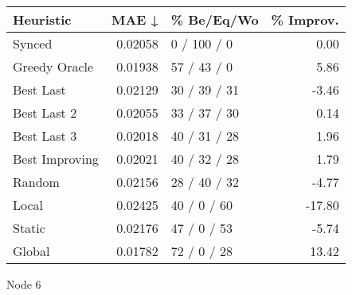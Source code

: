 \begin{tabular}{lrlr}
\toprule
\textbf{Heuristic} & \textbf{MAE ↓} & \textbf{\% Be/Eq/Wo} & \textbf{\% Improv.} \\
\midrule
            Synced &        0.02058 &          0 / 100 / 0 &                0.00 \\
     Greedy Oracle &        0.01938 &          57 / 43 / 0 &                5.86 \\
         Best Last &        0.02129 &         30 / 39 / 31 &               -3.46 \\
       Best Last 2 &        0.02055 &         33 / 37 / 30 &                0.14 \\
       Best Last 3 &        0.02018 &         40 / 31 / 28 &                1.96 \\
    Best Improving &        0.02021 &         40 / 32 / 28 &                1.79 \\
            Random &        0.02156 &         28 / 40 / 32 &               -4.77 \\
             Local &        0.02425 &          40 / 0 / 60 &              -17.80 \\
            Static &        0.02176 &          47 / 0 / 53 &               -5.74 \\
            Global &        0.01782 &          72 / 0 / 28 &               13.42 \\
\bottomrule
\end{tabular}
\caption{Node 6}
\label{tab:non_lr05_le2_bs2_6}
